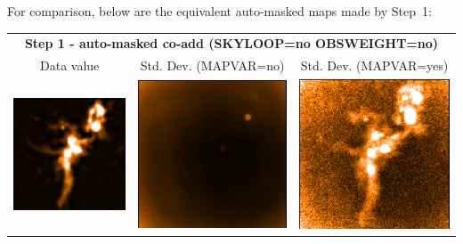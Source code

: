 \vspace{5mm}

For comparison, below are the equivalent auto-masked maps made by Step~1:

\vspace{5mm}
\begin{tabular}{|ccc|}
\hline
\multicolumn{3}{|c|}{\textbf{Step 1 - auto-masked co-add (SKYLOOP=no OBSWEIGHT=no)}} \\
Data value & Std. Dev. (MAPVAR=no) & Std. Dev. (MAPVAR=yes) \\
\includegraphics[width=\picwid]{tailoring/i5.png} &
\includegraphics[width=\picwid]{tailoring/sqvar5.png} &
\includegraphics[width=\picwid]{tailoring/disp5.png} \\
\hline
\end{tabular}


